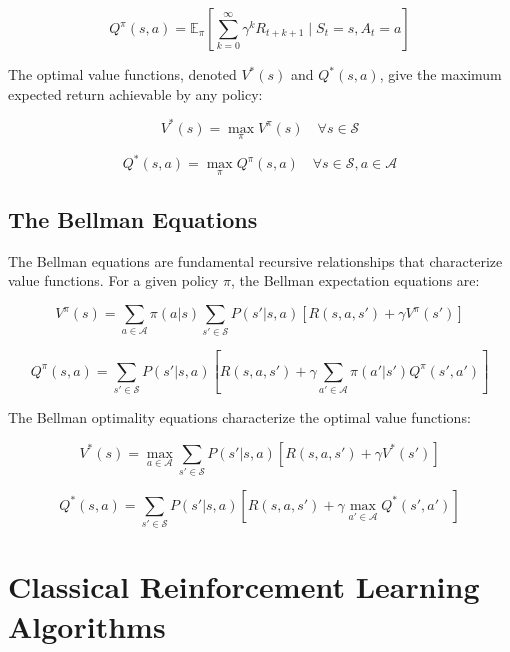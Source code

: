 \documentclass{article}
\begin{document}
\begin{equation}
Q^\pi(s, a) = \mathbb{E}_\pi\left[\sum_{k=0}^{\infty} \gamma^k R_{t+k+1} \mid S_t = s, A_t = a\right]
\end{equation}

The optimal value functions, denoted $V^*(s)$ and $Q^*(s, a)$, give the maximum expected return achievable by any policy:

\begin{equation}
V^*(s) = \max_\pi V^\pi(s) \quad \forall s \in \mathcal{S}
\end{equation}

\begin{equation}
Q^*(s, a) = \max_\pi Q^\pi(s, a) \quad \forall s \in \mathcal{S}, a \in \mathcal{A}
\end{equation}

\subsection{The Bellman Equations}

The Bellman equations are fundamental recursive relationships that characterize value functions. For a given policy $\pi$, the Bellman expectation equations are:

\begin{equation}
V^\pi(s) = \sum_{a \in \mathcal{A}} \pi(a|s) \sum_{s' \in \mathcal{S}} P(s'|s,a) [R(s,a,s') + \gamma V^\pi(s')]
\end{equation}

\begin{equation}
Q^\pi(s,a) = \sum_{s' \in \mathcal{S}} P(s'|s,a) [R(s,a,s') + \gamma \sum_{a' \in \mathcal{A}} \pi(a'|s') Q^\pi(s',a')]
\end{equation}

The Bellman optimality equations characterize the optimal value functions:

\begin{equation}
V^*(s) = \max_{a \in \mathcal{A}} \sum_{s' \in \mathcal{S}} P(s'|s,a) [R(s,a,s') + \gamma V^*(s')]
\end{equation}

\begin{equation}
Q^*(s,a) = \sum_{s' \in \mathcal{S}} P(s'|s,a) [R(s,a,s') + \gamma \max_{a' \in \mathcal{A}} Q^*(s',a')]
\end{equation}

\section{Classical Reinforcement Learning Algorithms}
\end{document}
